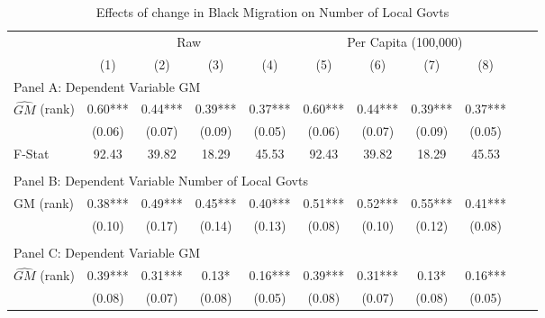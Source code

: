  \begin{table}[htbp]\centering {} \begin{threeparttable} \caption{Effects of change in Black Migration on Number of Local Govts} \begin{tabular}{l*{10}{c}} \toprule
                &\multicolumn{4}{c}{Raw}                                    &\multicolumn{4}{c}{Per Capita (100,000)}                   \\\cmidrule(lr){2-5}\cmidrule(lr){6-9}
                &\multicolumn{1}{c}{(1)}   &\multicolumn{1}{c}{(2)}   &\multicolumn{1}{c}{(3)}   &\multicolumn{1}{c}{(4)}   &\multicolumn{1}{c}{(5)}   &\multicolumn{1}{c}{(6)}   &\multicolumn{1}{c}{(7)}   &\multicolumn{1}{c}{(8)}   \\
\cmidrule(lr){1-9}
\multicolumn{8}{l}{Panel A: Dependent Variable GM}\\
\cmidrule(lr){1-9}
$\hat{GM}$ (rank)&       0.60***&       0.44***&       0.39***&       0.37***&       0.60***&       0.44***&       0.39***&       0.37***\\
                &     (0.06)   &     (0.07)   &     (0.09)   &     (0.05)   &     (0.06)   &     (0.07)   &     (0.09)   &     (0.05)   \\
\midrule
F-Stat          &      92.43   &      39.82   &      18.29   &      45.53   &      92.43   &      39.82   &      18.29   &      45.53   \\
\cmidrule[\heavyrulewidth](lr){1-9} \\ \cmidrule[\heavyrulewidth](lr){1-9}
\multicolumn{8}{l}{Panel B: Dependent Variable Number of Local Govts}\\
\cmidrule(lr){1-9}
GM  (rank)      &       0.38***&       0.49***&       0.45***&       0.40***&       0.51***&       0.52***&       0.55***&       0.41***\\
                &     (0.10)   &     (0.17)   &     (0.14)   &     (0.13)   &     (0.08)   &     (0.10)   &     (0.12)   &     (0.08)   \\
\cmidrule[\heavyrulewidth](lr){1-9} \\ \cmidrule[\heavyrulewidth](lr){1-9}
\multicolumn{8}{l}{Panel C: Dependent Variable GM}\\
\cmidrule(lr){1-9}
$\hat{GM}$ (rank)&       0.39***&       0.31***&       0.13*  &       0.16***&       0.39***&       0.31***&       0.13*  &       0.16***\\
                &     (0.08)   &     (0.07)   &     (0.08)   &     (0.05)   &     (0.08)   &     (0.07)   &     (0.08)   &     (0.05)   \\

\end{tabular}
\end{threeparttable}
\end{table}
